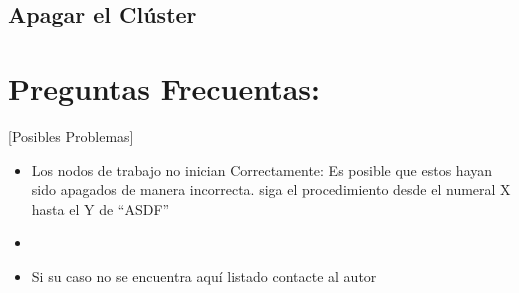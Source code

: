 \subsection{Apagar el Clúster}



\section{Preguntas Frecuentas:}[Posibles Problemas]

\begin{itemize}
	\item Los nodos de trabajo no inician Correctamente: Es posible que estos hayan sido apagados de manera incorrecta. 
	siga el procedimiento desde el numeral X hasta el Y de ``ASDF''

	\item 
	\item Si su caso no se encuentra aquí listado contacte al autor
\end{itemize}




